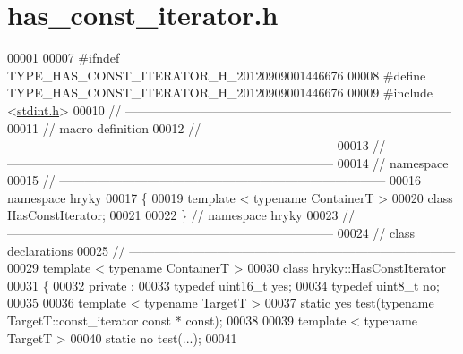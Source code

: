 \hypertarget{has__const__iterator_8h_source}{\section{has\-\_\-const\-\_\-iterator.\-h}
}

\begin{DoxyCode}
00001 
00007 \textcolor{preprocessor}{#ifndef TYPE\_HAS\_CONST\_ITERATOR\_H\_20120909001446676}
00008 \textcolor{preprocessor}{}\textcolor{preprocessor}{#define TYPE\_HAS\_CONST\_ITERATOR\_H\_20120909001446676}
00009 \textcolor{preprocessor}{}\textcolor{preprocessor}{#include <\hyperlink{stdint_8h}{stdint.h}>}
00010 \textcolor{comment}{//
      ------------------------------------------------------------------------------}
00011 \textcolor{comment}{// macro definition}
00012 \textcolor{comment}{//
      ------------------------------------------------------------------------------}
00013 \textcolor{comment}{//
      ------------------------------------------------------------------------------}
00014 \textcolor{comment}{// namespace}
00015 \textcolor{comment}{//
      ------------------------------------------------------------------------------}
00016 \textcolor{keyword}{namespace }hryky
00017 \{
00019     \textcolor{keyword}{template} < \textcolor{keyword}{typename} ContainerT >
00020     \textcolor{keyword}{class }HasConstIterator;
00021 
00022 \} \textcolor{comment}{// namespace hryky}
00023 \textcolor{comment}{//
      ------------------------------------------------------------------------------}
00024 \textcolor{comment}{// class declarations}
00025 \textcolor{comment}{//
      ------------------------------------------------------------------------------}
00029 \textcolor{comment}{}\textcolor{keyword}{template} < \textcolor{keyword}{typename} ContainerT >
\hypertarget{has__const__iterator_8h_source_l00030}{}\hyperlink{classhryky_1_1_has_const_iterator}{00030} \textcolor{keyword}{class }\hyperlink{classhryky_1_1_has_const_iterator}{hryky::HasConstIterator}
00031 \{
00032 \textcolor{keyword}{private} :
00033     \textcolor{keyword}{typedef} uint16\_t    yes;
00034     \textcolor{keyword}{typedef} uint8\_t     no;
00035 
00036     \textcolor{keyword}{template} < \textcolor{keyword}{typename} TargetT >
00037     \textcolor{keyword}{static} yes test(\textcolor{keyword}{typename} TargetT::const\_iterator \textcolor{keyword}{const} * \textcolor{keyword}{const});
00038     
00039     \textcolor{keyword}{template} < \textcolor{keyword}{typename} TargetT >
00040     \textcolor{keyword}{static} no test(...);
00041     

\end{DoxyCode}
